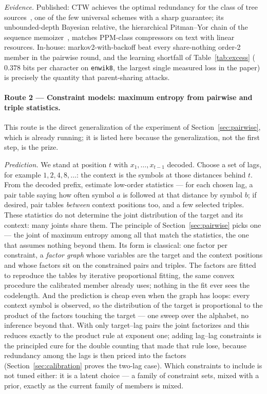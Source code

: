 \documentclass[11pt]{article}
\begin{document}
\emph{Evidence.}  Published: CTW achieves the optimal redundancy for
the class of tree sources~\cite{ctw95}, one of the few universal
schemes with a sharp guarantee; its unbounded-depth Bayesian
relative, the hierarchical Pitman--Yor chain of the sequence
memoizer~\cite{memoizer}, matches PPM-class compressors on text with
linear resources.  In-house: markov2-with-backoff beat every
share-nothing order-2 member in the pairwise round, and the learning
shortfall of Table~\ref{tab:excess} ($0.378$ bits per character
on \texttt{enwik8}, the largest single measured loss in the paper) is
precisely the quantity that parent-sharing attacks.

\paragraph{Route 2 --- Constraint models: maximum entropy from
pairwise and triple statistics.}
This route is the direct generalization of the experiment of
Section~\ref{sec:pairwise}, which is already running; it is listed
here because the generalization, not the first step, is the prize.

\emph{Prediction.}  We stand at position $t$ with
$x_1, \dots, x_{t-1}$ decoded.  Choose a set of lags, for example
$1, 2, 4, 8, \dots$: the context is the symbols at those distances
behind $t$.  From the decoded prefix, estimate low-order statistics
--- for each chosen lag, a pair table saying how often symbol $a$ is
followed at that distance by symbol $b$; if desired, pair tables
\emph{between} context positions too, and a few selected triples.
These statistics do not determine the joint distribution of the
target and its context: many joints share them.  The principle of
Section~\ref{sec:pairwise} picks one --- the joint of maximum entropy
among all that match the statistics, the one that assumes nothing
beyond them.  Its form is classical: one factor per constraint, a
\emph{factor graph} whose variables are the target and the context
positions and whose factors sit on the constrained pairs and triples.
The factors are fitted to reproduce the tables by iterative
proportional fitting, the same convex procedure the calibrated member
already uses; nothing in the fit ever sees the codelength.  And the
prediction is cheap even when the graph has loops: every context
symbol is observed, so the distribution of the target is proportional
to the product of the factors touching the target --- one sweep over
the alphabet, no inference beyond that.  With only target--lag pairs
the joint factorizes and this reduces exactly to the product rule at
exponent one; adding lag--lag constraints is the principled cure for
the double counting that made that rule lose, because redundancy
among the lags is then priced into the factors
(Section~\ref{sec:calibration} proves the two-lag case).  Which
constraints to include is not tuned either: it is a latent choice ---
a family of constraint sets, mixed with a prior, exactly as the
current family of members is mixed.
\end{document}
